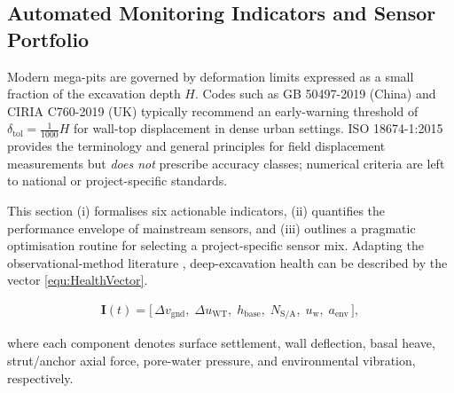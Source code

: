 \documentclass[preprint,11pt,authoryear,3p]{elsarticle}
\begin{document}
\subsection{Automated Monitoring Indicators and Sensor Portfolio}

Modern mega-pits are governed by deformation limits expressed as a small fraction of the excavation depth \(H\).  Codes such as GB 50497-2019 (China) and CIRIA C760-2019 (UK) typically recommend an early-warning threshold of \( \delta_{\mathrm{tol}} = \tfrac{1}{1000}H \) for wall-top displacement in dense urban settings\citep{GB50497:2019,CIRIA760}.  ISO 18674-1:2015 provides the terminology and general principles for field displacement measurements but \emph{does not} prescribe accuracy classes; numerical criteria are left to national or project-specific standards\citep{ISO18674-1:2015}.

This section (i) formalises six actionable indicators, (ii) quantifies the performance envelope of mainstream sensors, and (iii) outlines a pragmatic optimisation routine for selecting a project-specific sensor mix. Adapting the observational-method literature \citep{Dunnicliff2018}, deep-excavation health can be described by the vector \autoref{equ:HealthVector}.

\begin{align}\label{equ:HealthVector}
      \mathbf{I}(t)=
  \bigl[\,\Delta v_{\text{gnd}},\;
         \Delta u_{\text{WT}},\;
         h_{\text{base}},\;
         N_{\text{S/A}},\;
         u_{\text{w}},\;
         a_{\text{env}}\,\bigr],
\end{align}

where each component denotes surface settlement, wall deflection, basal heave, strut/anchor axial force, pore-water pressure, and environmental vibration, respectively.


\end{document}
